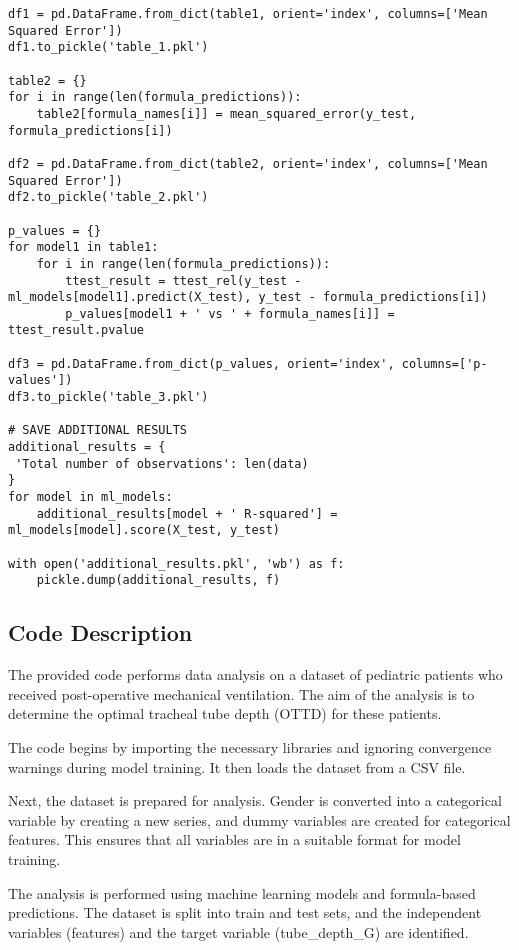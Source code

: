 \documentclass[11pt]{article}
\begin{document}
\begin{verbatim}
df1 = pd.DataFrame.from_dict(table1, orient='index', columns=['Mean Squared Error']) 
df1.to_pickle('table_1.pkl') 

table2 = {}
for i in range(len(formula_predictions)):
    table2[formula_names[i]] = mean_squared_error(y_test, formula_predictions[i]) 

df2 = pd.DataFrame.from_dict(table2, orient='index', columns=['Mean Squared Error'])
df2.to_pickle('table_2.pkl')

p_values = {}
for model1 in table1:
    for i in range(len(formula_predictions)):
        ttest_result = ttest_rel(y_test - ml_models[model1].predict(X_test), y_test - formula_predictions[i])
        p_values[model1 + ' vs ' + formula_names[i]] = ttest_result.pvalue

df3 = pd.DataFrame.from_dict(p_values, orient='index', columns=['p-values'])
df3.to_pickle('table_3.pkl')

# SAVE ADDITIONAL RESULTS
additional_results = {
 'Total number of observations': len(data)
}
for model in ml_models:
    additional_results[model + ' R-squared'] = ml_models[model].score(X_test, y_test)

with open('additional_results.pkl', 'wb') as f:
    pickle.dump(additional_results, f)

\end{verbatim}

\subsection{Code Description}

The provided code performs data analysis on a dataset of pediatric patients who received post-operative mechanical ventilation. The aim of the analysis is to determine the optimal tracheal tube depth (OTTD) for these patients.

The code begins by importing the necessary libraries and ignoring convergence warnings during model training. It then loads the dataset from a CSV file.

Next, the dataset is prepared for analysis. Gender is converted into a categorical variable by creating a new series, and dummy variables are created for categorical features. This ensures that all variables are in a suitable format for model training.

The analysis is performed using machine learning models and formula-based predictions. The dataset is split into train and test sets, and the independent variables (features) and the target variable (tube\_depth\_G) are identified. 
\end{document}
